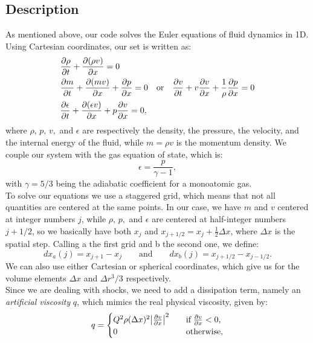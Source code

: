 \documentclass{article}
\begin{document}
\subsection{Description}\label{descrip}
As mentioned above, our code solves the Euler equations of fluid dynamics in 1D. Using Cartesian coordinates, our set is written as:
\begin{align}
	&\pdv{\rho}{t}+\pdv{(\rho v)}{x}=0 \label{eoc}\\
	&\pdv{m}{t}+\pdv{(mv)}{x}+\pdv{p}{x}=0\quad\text{or}\quad\pdv{v}{t}+v\pdv{v}{x}+\frac{1}{\rho}\pdv{p}{x}=0 \label{eom}\\
	&\pdv{\epsilon}{t}+\pdv{(\epsilon v)}{x}+p\pdv{v}{x}=0,\label{eoe}
\end{align}
where $\rho,\, p,\, v,$ and $\epsilon$ are respectively the density, the pressure, the velocity, and the internal energy of the fluid, while $m=\rho v$ is the momentum density. We couple our system with the gas equation of state, which is:
\begin{equation}\label{eqstate}
	\epsilon=\frac{p}{\gamma -1},
\end{equation}
with $\gamma=5/3$ being the adiabatic coefficient for a monoatomic gas.\\
To solve our equations we use a staggered grid, which means that not all quantities are centered at the same points. In our case, we have $m$ and $v$ centered at integer numbers $j$, while $\rho,\,p,$ and $\epsilon$ are centered at half-integer numbers $j+1/2$, so we basically have both $x_{j}$ and $x_{j+1/2}=x_{j}+\frac{1}{2}\Delta x$, where $\Delta x$ is the spatial step. 
Calling a the first grid and b the second one, we define:
\begin{equation*}
	dx_a(j)=x_{j+1}-x_{j} \qquad \text{and} \qquad dx_b(j)=x_{j+1/2}-x_{j-1/2}.
\end{equation*}
We can also use either Cartesian or spherical coordinates, which give us for the volume elements $\Delta x$ and $\Delta r^3/3$ respectively.\\
Since we are dealing with shocks, we need to add a dissipation term, namely an \textit{artificial viscosity} $q$, which mimics the real physical viscosity, given by:
\begin{equation}
	q=
	\begin{cases}
		Q^2 \rho(\Delta x)^2 \abs{\pdv{v}{x}}^2\quad &\text{if} \; \pdv{v}{x}<0,\\
		0 \quad &\text{otherwise},
	\end{cases}
\end{equation} 
\end{document}
